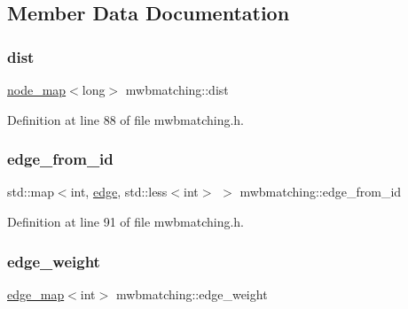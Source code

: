 \subsection{Member Data Documentation}
\mbox{\label{classmwbmatching_aad0fd09452bf87f0e8e95c74441f5e8a}} 
\subsubsection{\texorpdfstring{dist}{dist}}
{\footnotesize\ttfamily \mbox{\hyperlink{classnode__map}{node\+\_\+map}}$<$long$>$ mwbmatching\+::dist\hspace{0.3cm}{\ttfamily [protected]}}



Definition at line 88 of file mwbmatching.\+h.

\mbox{\label{classmwbmatching_afebc731e1dd5a37df6467258bfe07887}} 
\subsubsection{\texorpdfstring{edge\+\_\+from\+\_\+id}{edge\_from\_id}}
{\footnotesize\ttfamily std\+::map$<$int, \mbox{\hyperlink{classedge}{edge}}, std\+::less$<$int$>$ $>$ mwbmatching\+::edge\+\_\+from\+\_\+id\hspace{0.3cm}{\ttfamily [protected]}}



Definition at line 91 of file mwbmatching.\+h.

\mbox{\label{classmwbmatching_a9624508c4944bffc6a349aa76ce6964c}} 
\subsubsection{\texorpdfstring{edge\+\_\+weight}{edge\_weight}}
{\footnotesize\ttfamily \mbox{\hyperlink{classedge__map}{edge\+\_\+map}}$<$int$>$ mwbmatching\+::edge\+\_\+weight\hspace{0.3cm}{\ttfamily [protected]}}



